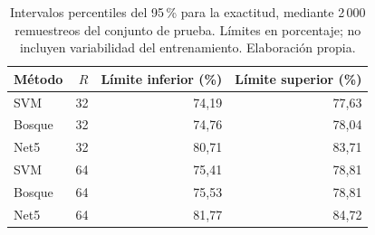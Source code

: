 \begin{table}[htbp]\centering\small
\caption{Intervalos percentiles del 95\,\% para la exactitud, mediante 2\,000 remuestreos del conjunto de prueba. Límites en porcentaje; no incluyen variabilidad del entrenamiento. Elaboración propia.}\label{tab:intervalos-finales}
\begin{tabular}{@{}lrrr@{}}\toprule
Método & $R$ & Límite inferior (\%) & Límite superior (\%) \\\midrule
SVM & 32 & 74,19 & 77,63 \\
Bosque & 32 & 74,76 & 78,04 \\
Net5 & 32 & 80,71 & 83,71 \\
SVM & 64 & 75,41 & 78,81 \\
Bosque & 64 & 75,53 & 78,81 \\
Net5 & 64 & 81,77 & 84,72 \\\bottomrule\end{tabular}\end{table}